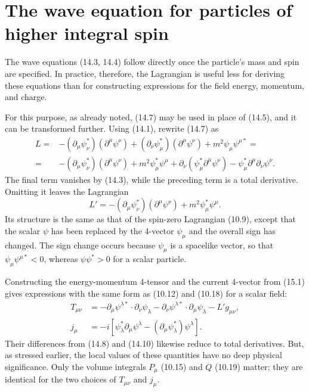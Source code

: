 
\section{The wave equation for particles of higher integral spin}

The wave equations (14.3, 14.4) follow directly once the particle's mass and spin are specified. In practice, therefore, the Lagrangian is useful less for deriving these equations than for constructing expressions for the field energy, momentum, and charge.

For this purpose, as already noted, (14.7) may be used in place of (14.5), and it can be transformed further. Using (14.1), rewrite (14.7) as
\[
\begin{split}
L={}&-(\partial_\mu\psi_\nu^*)(\partial^\mu\psi^\nu)
+(\partial_\nu\psi_\mu^*)(\partial^\mu\psi^\nu)
+m^2\psi_\mu\psi^{\mu*}={}\\
={}&-(\partial_\mu\psi_\nu^*)(\partial^\mu\psi^\nu)
+m^2\psi_\mu^*\psi^\mu
+\partial_\nu(\psi_\mu^*\partial^\mu\psi^\nu)
-\psi_\mu^*\partial^\mu\partial_\nu\psi^\nu.
\end{split}
\]
The final term vanishes by (14.3), while the preceding term is a total derivative. Omitting it leaves the Lagrangian
\begin{equation}
L'=-(\partial_\mu\psi_\nu^*)(\partial^\mu\psi^\nu)
+m^2\psi_\mu^*\psi^\mu.
\tag{15.1}
\end{equation}
Its structure is the same as that of the spin-zero Lagrangian (10.9), except that the scalar $\psi$ has been replaced by the 4-vector $\psi_\mu$ and the overall sign has changed. The sign change occurs because $\psi_\mu$ is a spacelike vector, so that $\psi_\mu\psi^{\mu*}<0$, whereas $\psi\psi^*>0$ for a scalar particle.

Constructing the energy-momentum 4-tensor and the current 4-vector from (15.1) gives expressions with the same form as (10.12) and (10.18) for a scalar field:
\begin{align}
T_{\mu\nu}
&=-\partial_\mu\psi^{\lambda*}\cdot\partial_\nu\psi_\lambda
-\partial_\nu\psi^{\lambda*}\cdot\partial_\mu\psi_\lambda
-L'g_{\mu\nu},
\tag{15.2}\\
j_\mu
&=-i\left[\psi_\lambda^*\partial_\mu\psi^\lambda
-(\partial_\mu\psi_\lambda^*)\psi^\lambda\right].
\tag{15.3}
\end{align}
Their differences from (14.8) and (14.10) likewise reduce to total derivatives. But, as stressed earlier, the local values of these quantities have no deep physical significance. Only the volume integrals $P_\mu$ (10.15) and $Q$ (10.19) matter; they are identical for the two choices of $T_{\mu\nu}$ and $j_\mu$.

